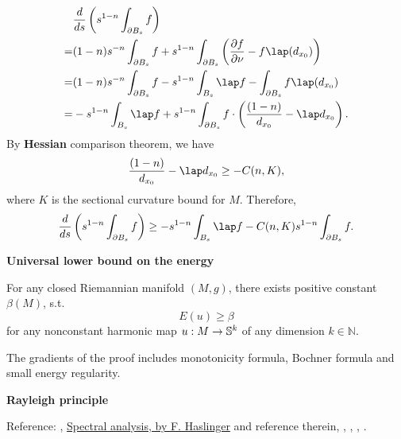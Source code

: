 \documentclass[a4paper,12pt]{article}
\begin{document}
$$ \begin{aligned}
    &\frac{d}{ds} \left( s^{1-n} \int_{\partial B_s}^{} f\right) \\
    =& (1-n)s^{-n}\int_{\partial B_s}^{}f + s^{1-n} \int_{\partial B_{s}}^{} \left( \frac{\partial f}{\partial \nu }-f \lap (d_{x_0}) \right)\\
    =& (1-n)s^{-n}\int_{\partial B_s}^{}f - s^{1-n} \int_{ B_{s}}^{} \lap f-\int_{\partial B_s}^{} f \lap (d_{x_0}) \\
    =&  - s^{1-n} \int_{ B_{s}}^{} \lap f + s^{1-n} \int_{\partial B_s}^{} f \cdot \left( \frac{(1-n)}{d_{x_0}} -\lap d_{x_0} \right).
\end{aligned}  $$ 
By \textbf{Hessian} comparison theorem, we have 
$$ \frac{(1-n)}{d_{x_0}} -\lap d_{x_0} \geq -C(n,K), $$
where $K$ is the sectional curvature bound for $M$.
Therefore,   
\begin{equation}
    \frac{d}{ds} \left( s^{1-n} \int_{\partial B_s}^{} f\right) \geq - s^{1-n} \int_{ B_{s}}^{} \lap f - C(n,K)s^{1-n} \int_{\partial B_s}^{} f .
\end{equation}


\np \textbf{Universal lower bound on the energy}
\begin{proposition}
    For any closed Riemannian manifold $(M,g)$, there exists positive constant $\beta (M)$, s.t. 
    \begin{equation}
        E(u) \geq \beta 
    \end{equation}
    for any nonconstant harmonic map 
    $u:M \to \ss^k$ of any dimension $k \in \mathbb{N}$.    
\end{proposition}

The gradients of the proof includes monotonicity formula, Bochner formula and small energy regularity. 

\np \textbf{Rayleigh principle}

Reference: \cite[\S 6.5, \S 6.6, Appendix D]{evansPDE}, \hyperlink{https://www.mat.univie.ac.at/~has/spectral.pdf}{Spectral analysis, by F. Haslinger} and reference therein, 
\cite[chap 11]{Helffer2013Spectrala},
\cite{Rosenberg1997Laplacian}, \cite{Chavel1984Eigenvalues}, \cite[P84-86]{Thorpe1979Elementary}.
\end{document}
